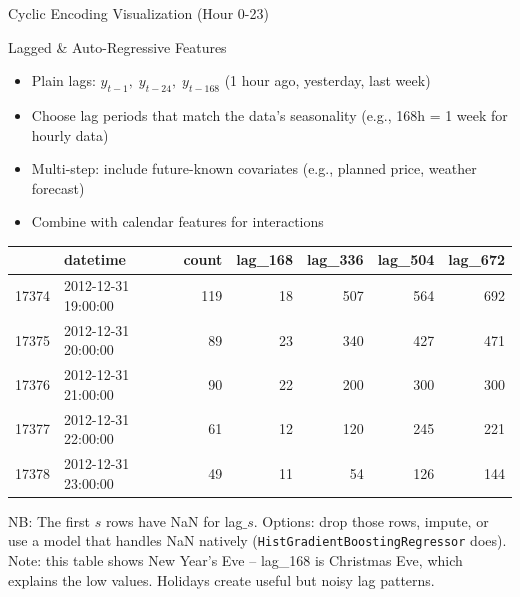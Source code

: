 \documentclass[11pt,compress,t,notes=noshow, xcolor=table]{beamer}
\begin{document}
\begin{vbframe}{Cyclic Encoding Visualization (Hour 0-23)}
  \begin{figure}
    \centering
  \end{figure}
\end{vbframe}

\begin{vbframe}{Lagged \& Auto-Regressive Features}
  \vfill
  \begin{itemize}
    \item Plain lags: $y_{t-1},\;y_{t-24},\;y_{t-168}$ (1 hour ago, yesterday, last week)
    \item Choose lag periods that match the data's seasonality (e.g., 168h = 1 week for hourly data)
    \item Multi-step: include future-known covariates (e.g., planned price, weather forecast)
    \item Combine with calendar features for interactions
  \end{itemize}
  \vfill
  \pause
\footnotesize
\begin{tabular}{llrrrrr}
\toprule
 & datetime & count & lag\_168 & lag\_336 & lag\_504 & lag\_672 \\
\midrule
17374 & 2012-12-31 19:00:00 & 119 & 18 & 507 & 564 & 692 \\
17375 & 2012-12-31 20:00:00 & 89 & 23 & 340 & 427 & 471 \\
17376 & 2012-12-31 21:00:00 & 90 & 22 & 200 & 300 & 300 \\
17377 & 2012-12-31 22:00:00 & 61 & 12 & 120 & 245 & 221 \\
17378 & 2012-12-31 23:00:00 & 49 & 11 & 54 & 126 & 144 \\
\bottomrule
\end{tabular}
\vfill
NB: The first $s$ rows have NaN for lag$\_s$. Options: drop those rows, impute, or use a model that handles NaN natively (\texttt{HistGradientBoostingRegressor} does).\\
Note: this table shows New Year's Eve -- lag\_168 is Christmas Eve, which explains the low values. Holidays create useful but noisy lag patterns.
\vfill
\end{vbframe}
\end{document}
